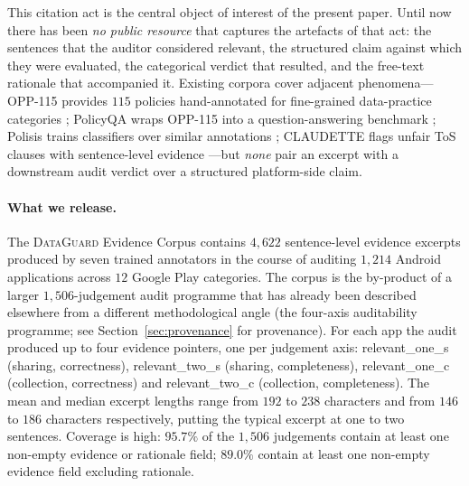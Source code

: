 \documentclass[11pt,a4paper]{article}
\newcommand{\dataguard}{\textsc{DataGuard}}
\newcommand{\dec}[1]{\textsf{#1}}
\begin{document}
This citation act is the central object of interest of the present
paper. Until now there has been \emph{no public resource} that
captures the artefacts of that act: the sentences that the auditor
considered relevant, the structured claim against which they were
evaluated, the categorical verdict that resulted, and the free-text
rationale that accompanied it. Existing corpora cover adjacent
phenomena---OPP-115 provides $115$ policies hand-annotated for
fine-grained data-practice categories \citep{wilson2016creation};
PolicyQA wraps OPP-115 into a question-answering benchmark
\citep{ravichander2019question}; Polisis trains classifiers over
similar annotations \citep{harkous2018polisis}; CLAUDETTE flags unfair
ToS clauses with sentence-level evidence \citep{lippi2019claudette}---but
\emph{none} pair an excerpt with a downstream audit verdict over a
structured platform-side claim.

\paragraph{What we release.}
The \dataguard{} Evidence Corpus contains $4{,}622$
sentence-level evidence excerpts produced by seven trained annotators
in the course of auditing $1{,}214$ Android applications across $12$
Google Play categories. The corpus is the by-product of a larger
$1{,}506$-judgement audit programme that has already been described
elsewhere from a different methodological angle (the four-axis
auditability programme; see Section~\ref{sec:provenance} for
provenance). For each app the audit produced up to four evidence
pointers, one per judgement axis:
\dec{relevant\_one\_s} (sharing, correctness),
\dec{relevant\_two\_s} (sharing, completeness),
\dec{relevant\_one\_c} (collection, correctness) and
\dec{relevant\_two\_c} (collection, completeness). The mean and median
excerpt lengths range from $192$ to $238$ characters and from $146$ to
$186$ characters respectively, putting the typical excerpt at one to
two sentences. Coverage is high: $95.7\%$ of the $1{,}506$ judgements
contain at least one non-empty evidence or rationale field;
$89.0\%$ contain at least one non-empty evidence field excluding
rationale.
\end{document}

